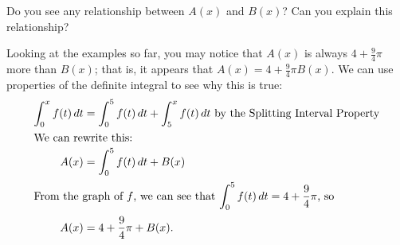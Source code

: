 \documentclass{article}
\begin{document}
\begin{enumerate}
  \begin{problem}[\vfill\newpage]
    Do you see any relationship between $A(x)$ and $B(x)$?  Can
    you explain this relationship?
  \end{problem}

  \begin{solution}
    Looking at the examples so far, you may notice that $A(x)$ is
    always $4+\frac{9}{4}\pi$ more than $B(x)$; that is, 
    it appears that $A(x)
    = 4 + \frac{9}{4}\pi B(x)$.  
    We can use properties of the definite integral to see why this is true: 
    \begin{align*}
      \int_0^x f(t)\,dt &= \int_0^5 f(t)\,dt + \int_5^x f(t)\,dt \text{ by
        the Splitting Interval Property} \\
      \shortintertext{We can rewrite this:}
      A(x) &= \int_0^5 f(t)\,dt + B(x) \\
      \intertext{From the graph of $f$, we can see that $\displaystyle
        \int_0^5 f(t)\,dt = 4 + \frac{9}{4}\pi$, so}
      A(x) &= 4 + \frac{9}{4}\pi + B(x). 
    \end{align*}
  \end{solution}








\end{enumerate}
\end{document}
